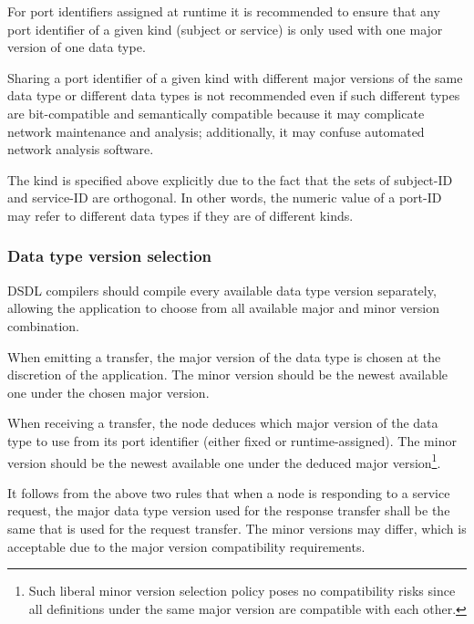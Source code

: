For port identifiers assigned at runtime
it is recommended to ensure that any port identifier of a given kind (subject or service)
is only used with one major version of one data type.

Sharing a port identifier of a given kind with different major versions of the same data type or different data types
is not recommended even if such different types are bit-compatible and semantically compatible
because it may complicate network maintenance and analysis; additionally, it may confuse automated
network analysis software.

The kind is specified above explicitly due to the fact that the sets of subject-ID and service-ID are orthogonal.
In other words,
the numeric value of a port-ID may refer to different data types if they are of different kinds.

\subsubsection{Data type version selection}

DSDL compilers should compile every available data type version separately,
allowing the application to choose from all available major and minor version combination.

When emitting a transfer, the major version of the data type is chosen at the discretion of the application.
The minor version should be the newest available one under the chosen major version.

When receiving a transfer, the node deduces which major version of the data type to use
from its port identifier (either fixed or runtime-assigned).
The minor version should be the newest available one under the deduced major version\footnote{%
Such liberal minor version selection policy poses no compatibility risks since all definitions under the same
major version are compatible with each other.}.

It follows from the above two rules that when a node is responding to a service request,
the major data type version used for the response transfer shall be the same that is used for the request transfer.
The minor versions may differ, which is acceptable due to the major version compatibility requirements.

